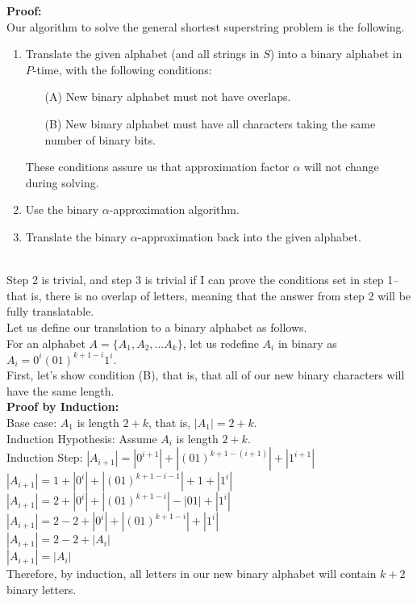 \documentclass[12pt]{article}
\begin{document}
\begin{itemize}
\noindent\textbf{Proof:}
\\Our algorithm to solve the general shortest superstring problem is the following.
\begin{enumerate}
	\item Translate the given alphabet (and all strings in $S$) into a binary alphabet in $P$-time, with the following conditions:
	\begin{itemize}
		\item[(A)] New binary alphabet must not have overlaps.
		\item[(B)] New binary alphabet must have all characters taking the same number of binary bits.
	\end{itemize}
	These conditions assure us that approximation factor $\alpha$ will not change during solving.
	\item Use the binary $\alpha$-approximation algorithm.
	\item Translate the binary $\alpha$-approximation back into the given alphabet.
\end{enumerate}
\\Step 2 is trivial, and step 3 is trivial if I can prove the conditions set in step 1-- that is, there is no overlap of letters, meaning that the answer from step 2 will be fully translatable. 
\\Let us define our translation to a binary alphabet as follows.
\\For an alphabet $A=\{A_1,A_2,...A_k\}$, let us redefine $A_i$ in binary as $A_i = 0^i(01)^{k+1-i}1^i$.
\\First, let's show condition (B), that is, that all of our new binary characters will have the same length. 
\\\textbf{Proof by Induction:}
\\Base case: $A_1$ is length $2+k$, that is, $|A_1| = 2+k$.
\\Induction Hypothesis: Assume $A_i$ is length $2+k$.
\\Induction Step: $|A_{i+1}| = |0^{i+1}| + |(01)^{k+1-(i+1)}| + |1^{i+1}|$
\\$|A_{i+1}| = 1+|0^{i}| + |(01)^{k+1-i-1}| + 1+|1^{i}|$
\\$|A_{i+1}| = 2+|0^{i}| + |(01)^{k+1-i}| - |01| + |1^{i}|$
\\$|A_{i+1}| = 2 - 2 + |0^{i}| + |(01)^{k+1-i}| + |1^{i}|$
\\$|A_{i+1}| = 2 - 2 + |A_i|$
\\$|A_{i+1}| = |A_i|$
\\Therefore, by induction, all letters in our new binary alphabet will contain $k+2$ binary letters.

\end{itemize}
\end{document}

